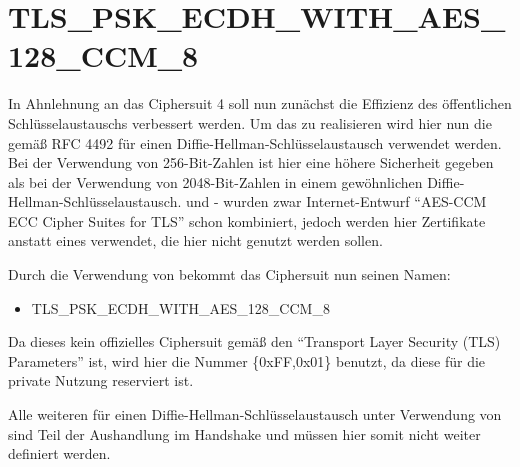 \section{TLS\_PSK\_ECDH\_WITH\_AES\_128\_CCM\_8}

In Ahnlehnung an das Ciphersuit 4 soll nun zunächst die Effizienz des öffentlichen Schlüsselaustauschs verbessert werden. Um das zu realisieren
wird hier nun die  gemäß RFC 4492 \cite{rfc4492} für einen Diffie-Hellman-Schlüsselaustausch verwendet werden. Bei der Verwendung von
256-Bit-Zahlen ist hier eine höhere Sicherheit gegeben als bei der Verwendung von 2048-Bit-Zahlen in einem gewöhnlichen Diffie-Hellman-Schlüsselaustausch.
 und - wurden zwar Internet-Entwurf "`AES-CCM ECC Cipher Suites for TLS"' \cite{draftaesecc} schon kombiniert, jedoch
werden hier Zertifikate anstatt eines  verwendet, die hier nicht genutzt werden sollen.

Durch die Verwendung von  bekommt das Ciphersuit nun seinen Namen:
\begin{itemize}
  \item TLS\_PSK\_ECDH\_WITH\_AES\_128\_CCM\_8
\end{itemize}
Da dieses kein offizielles Ciphersuit gemäß den "`Transport Layer Security (TLS) Parameters"' \cite{tlsparams} ist, wird hier die Nummer
\{0xFF,0x01\} benutzt, da diese für die private Nutzung reserviert ist.

Alle weiteren für einen Diffie-Hellman-Schlüsselaustausch unter Verwendung von  sind Teil der Aushandlung im Handshake und müssen
hier somit nicht weiter definiert werden.

